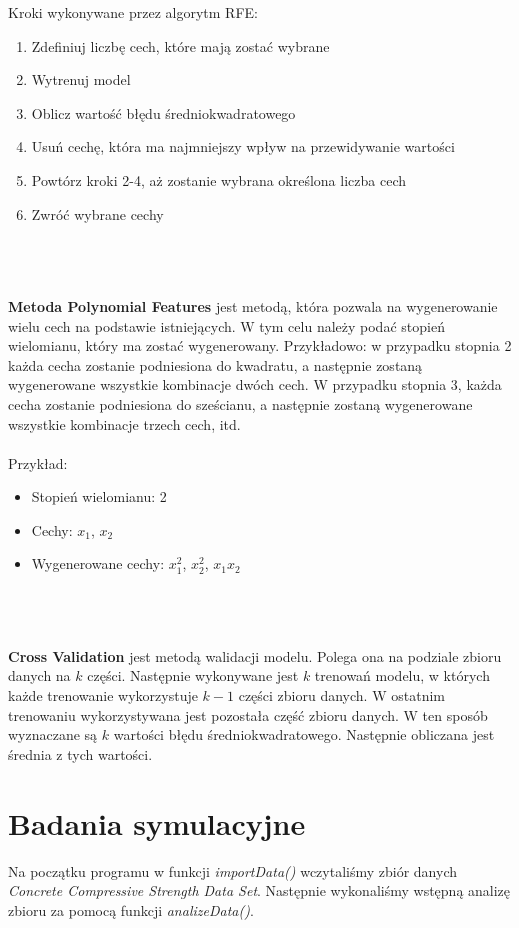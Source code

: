 \documentclass[11pt, a4paper, notitlepage]{report}
\begin{document}
Kroki wykonywane przez algorytm RFE:
\begin{enumerate}
	\item Zdefiniuj liczbę cech, które mają zostać wybrane
	\item Wytrenuj model
	\item Oblicz wartość błędu średniokwadratowego
	\item Usuń cechę, która ma najmniejszy wpływ na przewidywanie wartości
	\item Powtórz kroki 2-4, aż zostanie wybrana określona liczba cech
	\item Zwróć wybrane cechy
\end{enumerate}
\\ \\ \\
\textbf{Metoda Polynomial Features} jest metodą, która pozwala na wygenerowanie wielu cech na podstawie istniejących. W tym celu należy podać stopień wielomianu, który ma zostać wygenerowany. Przykładowo: w przypadku stopnia 2 każda cecha zostanie podniesiona do kwadratu, a następnie zostaną wygenerowane wszystkie kombinacje dwóch cech. W przypadku stopnia 3, każda cecha zostanie podniesiona do sześcianu, a następnie zostaną wygenerowane wszystkie kombinacje trzech cech, itd.
\\ \\
Przykład:
\begin{itemize}
	\item Stopień wielomianu: 2
	\item Cechy: $x_1$, $x_2$
	\item Wygenerowane cechy: $x_1^2$, $x_2^2$, $x_1x_2$
\end{itemize}
\\ \\ \\
\textbf{Cross Validation} jest metodą walidacji modelu. Polega ona na podziale zbioru danych na $k$ części. Następnie wykonywane jest $k$ trenowań modelu, w których każde trenowanie wykorzystuje $k-1$ części zbioru danych. W ostatnim trenowaniu wykorzystywana jest pozostała część zbioru danych. W ten sposób wyznaczane są $k$ wartości błędu średniokwadratowego. Następnie obliczana jest średnia z tych wartości.

\section{Badania symulacyjne}
Na początku programu w funkcji \textit{importData()} wczytaliśmy zbiór danych \textit{Concrete Compressive Strength Data Set}. Następnie wykonaliśmy wstępną analizę zbioru za pomocą funkcji \textit{analizeData()}.
\\ \\
\end{document}
